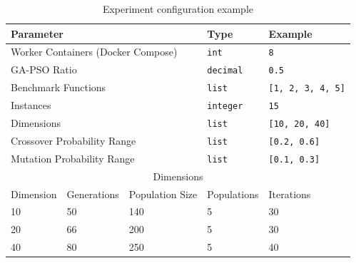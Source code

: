 \documentclass[review]{elsarticle}
\begin{document}
\begin{table}
    \small
    \caption{ Experiment configuration example 
    }
    \label{tab:params}
    \centering
    \small
    \begin{tabular}{|l|l|l|l|l|}
      \hline
      \multicolumn{3}{|l|}{Parameter}                    & Type             & Example         \\ \hline
      \multicolumn{3}{|l|}{Worker Containers (Docker Compose)}        & \texttt{int}     & \texttt{8} \\ \hline
      \multicolumn{3}{|l|}{GA-PSO Ratio}                 & \texttt{decimal} & \texttt{0.5}    \\  \hline
      \multicolumn{3}{|l|}{Benchmark Functions}          & \texttt{list}    & \texttt{[1, 2, 3, 4, 5]} \\ \hline
      \multicolumn{3}{|l|}{Instances}                    & \texttt{integer}    & \texttt{15} \\ \hline
      \multicolumn{3}{|l|}{Dimensions}                   & \texttt{list}    & \texttt{[10, 20, 40]}        \\ \hline
      \multicolumn{3}{|l|}{Crossover Probability Range}  & \texttt{list}    & \texttt{[0.2, 0.6]}      \\ \hline
      \multicolumn{3}{|l|}{Mutation  Probability Range}  & \texttt{list}    & \texttt{[0.1, 0.3]}      \\ \hline
      \multicolumn{5}{|c|}{Dimensions}                                                      \\ \hline  
      Dimension               & Generations & Population Size & Populations  &     Iterations    \\ \hline
              10              & 50      & 140                 &      5                 & 30                \\ \hline
              20              & 66      & 200                 &      5                 & 30               \\ \hline
              40              & 80      & 250                 &      5                 & 40                \\ \hline
    \end{tabular}
\end{table}

\end{document}
